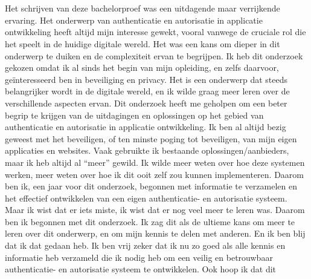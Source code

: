
\chapter*{}%
\label{ch:voorwoord}


Het schrijven van deze bachelorproef was een uitdagende maar verrijkende ervaring. Het onderwerp van authenticatie en autorisatie in applicatie ontwikkeling heeft altijd mijn interesse gewekt, 
vooral vanwege de cruciale rol die het speelt in de huidige digitale wereld. Het was een kans om dieper in dit onderwerp te duiken en de complexiteit ervan te begrijpen.
Ik heb dit onderzoek gekozen omdat ik al sinds het begin van mijn opleiding, en zelfs daarvoor, geïnteresseerd ben in beveiliging en privacy. Het is een onderwerp dat steeds belangrijker wordt 
in de digitale wereld, en ik wilde graag meer leren over de verschillende aspecten ervan. Dit onderzoek heeft me geholpen om een beter begrip te krijgen van de uitdagingen en oplossingen op het gebied van
authenticatie en autorisatie in applicatie ontwikkeling.
\newline
Ik ben al altijd bezig geweest met het beveiligen, of ten minste poging tot beveiligen, van mijn eigen applicaties en websites. Vaak gebruikte ik bestaande oplossingen/aanbieders, maar ik heb altijd al ``meer'' gewild.
Ik wilde meer weten over hoe deze systemen werken, meer weten over hoe ik dit ooit zelf zou kunnen implementeren. Daarom ben ik, een jaar voor dit onderzoek, begonnen met informatie te verzamelen en
het effectief ontwikkelen van een eigen authenticatie- en autorisatie systeem. Maar ik wist dat er iets miste, ik wist dat er nog veel meer te leren was.
\newline
Daarom ben ik begonnen met dit onderzoek. Ik zag dit als de ultieme kans om meer te leren over dit onderwerp, en om mijn kennis te delen met anderen. En ik ben blij dat ik dat gedaan heb.
Ik ben vrij zeker dat ik nu zo goed als alle kennis en informatie heb verzameld die ik nodig heb om een veilig en betrouwbaar authenticatie- en autorisatie systeem te ontwikkelen. Ook hoop ik dat dit

